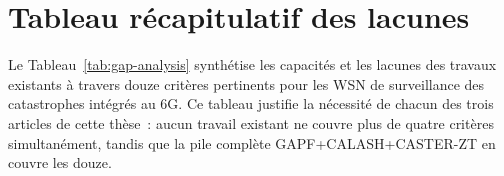\section{Tableau récapitulatif des lacunes}\label{sec:revlit-gap-table}

Le Tableau~\ref{tab:gap-analysis} synthétise les capacités et les lacunes des travaux existants à travers douze critères pertinents pour les WSN de surveillance des catastrophes intégrés au 6G. Ce tableau justifie la nécessité de chacun des trois articles de cette thèse~: aucun travail existant ne couvre plus de quatre critères simultanément, tandis que la pile complète GAPF+CALASH+CASTER-ZT en couvre les douze.

\begin{table}[htbp]
\centering
\caption{Analyse des lacunes de la littérature. ~=~présent, ~=~absent, $\circ$~=~partiel. Les douze critères sont regroupés en trois catégories~: efficacité (E1--E4), durabilité (D1--D4) et sécurité (S1--S4).}
\label{tab:gap-analysis}
\end{table}
